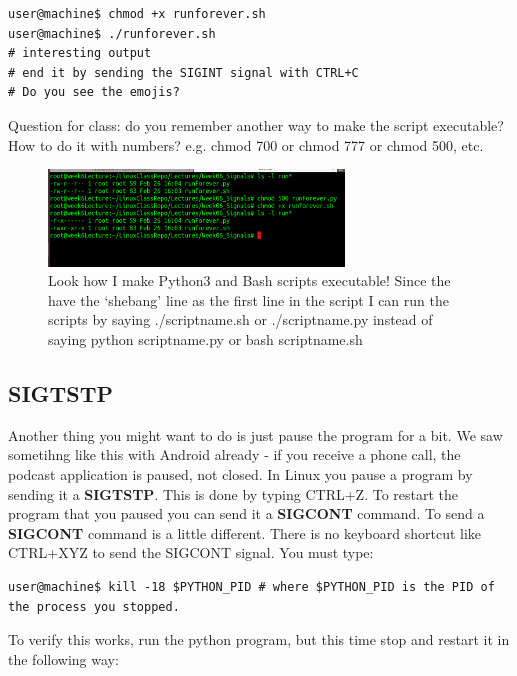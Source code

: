 \documentclass[8pt]{article}
\begin{document}
\begin{lstlisting}[style=term]
user@machine$ chmod +x runforever.sh
user@machine$ ./runforever.sh
# interesting output
# end it by sending the SIGINT signal with CTRL+C
# Do you see the emojis?
\end{lstlisting}

{\Large Question for class: do you remember another way to make the script
executable? How to do it with numbers? e.g. chmod 700 or chmod 777 or chmod 500,
etc.}

\begin{figure}[ht]
	\centering
	\includegraphics[width=0.7\textwidth]{Images/madeExecutable.png}
	\caption{Look how I make Python3 and Bash scripts executable! Since the have
the `shebang' line as the first line in the script I can run the scripts by
saying ./scriptname.sh or ./scriptname.py instead of saying python scriptname.py
or bash scriptname.sh}
	\label{fig:executable}
\end{figure}

\subsection{SIGTSTP}
Another thing you might want to do is just pause the program for a bit. We saw
sometihng like this with Android already - if you receive a phone call, the
podcast application is paused, not closed. In Linux you pause a program by sending it 
a \textbf{SIGTSTP}. This is done by typing CTRL+Z. To restart the program that you
 paused you can send it a \textbf{SIGCONT} command. To send a \textbf{SIGCONT}
 command is a little different. There is no keyboard shortcut like CTRL+XYZ to
send the SIGCONT signal. You must type:

\begin{lstlisting}[style=term]
user@machine$ kill -18 $PYTHON_PID # where $PYTHON_PID is the PID of the process you stopped.
\end{lstlisting}

To verify this works, run the python program, but this time stop and restart it
in the following way:
\end{document}
